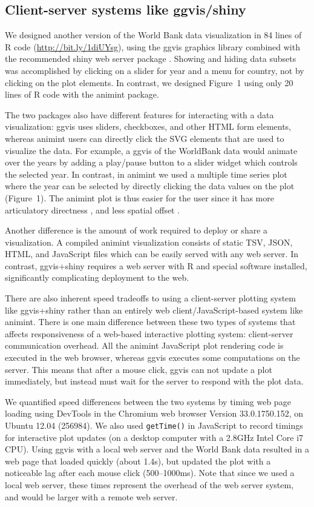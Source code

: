 \documentclass[journal]{vgtc}\usepackage[]{graphicx}\usepackage[]{color}
\begin{document}
\subsection{Client-server systems like ggvis/shiny}

We designed another version of the World Bank data visualization in 84
lines of R code (\url{http://bit.ly/1diUYsg}), using the ggvis
graphics library combined with the recommended shiny web server
package \citep{shiny, ggvis}. Showing and hiding data subsets was
accomplished by clicking on a slider for year and a menu for country,
not by clicking on the plot elements. In contrast, we designed
Figure~1 using only 20 lines of R code with the animint package.

The two packages also have different features for interacting with a
data visualization: ggvis uses sliders, checkboxes, and other HTML
form elements, whereas animint users can directly click the SVG
elements that are used to visualize the data. For example, a ggvis of
the WorldBank data would animate over the years by adding a play/pause
button to a slider widget which controls the selected year. In
contrast, in animint we used a multiple time series plot where the
year can be selected by directly clicking the data values on the plot
(Figure~1). The animint plot is thus easier for the user since it has
more articulatory directness \citep{Hutchins:1985}, and less spatial
offset \citep{instrumental-interaction}.

Another difference is the amount of work required to deploy or share a
visualization. A compiled animint visualization consists of static
TSV, JSON, HTML, and JavaScript files which can be easily served with
any web server. In contrast, ggvis+shiny requires a web server with R
and special software installed, significantly complicating
deployment to the web.

There are also inherent speed tradeoffs to using a client-server
plotting system like ggvis+shiny rather than an entirely web
client/JavaScript-based system like animint. There is one main
difference between these two types of systems that affects
responsiveness of a web-based interactive plotting system:
client-server communication overhead. All the animint
JavaScript plot rendering code is executed in the web browser, whereas
ggvis executes some computations on the server. This means that after
a mouse click, ggvis can not update a plot immediately, but instead
must wait for the server to respond with the plot data.

We quantified speed differences between the two systems by timing web
page loading using DevTools in the Chromium web browser Version
33.0.1750.152, on Ubuntu 12.04 (256984). We also used \texttt{getTime()}
in JavaScript to record timings for interactive plot updates (on a
desktop computer with a 2.8GHz Intel Core i7 CPU). Using ggvis with a
local web server and the World Bank data resulted in a web page that
loaded quickly (about 1.4s), but updated the plot with a noticeable
lag after each mouse click (500--1000ms). Note that since we used a
local web server, these times represent the overhead of the web server
system, and would be larger with a remote web server.
\end{document}

